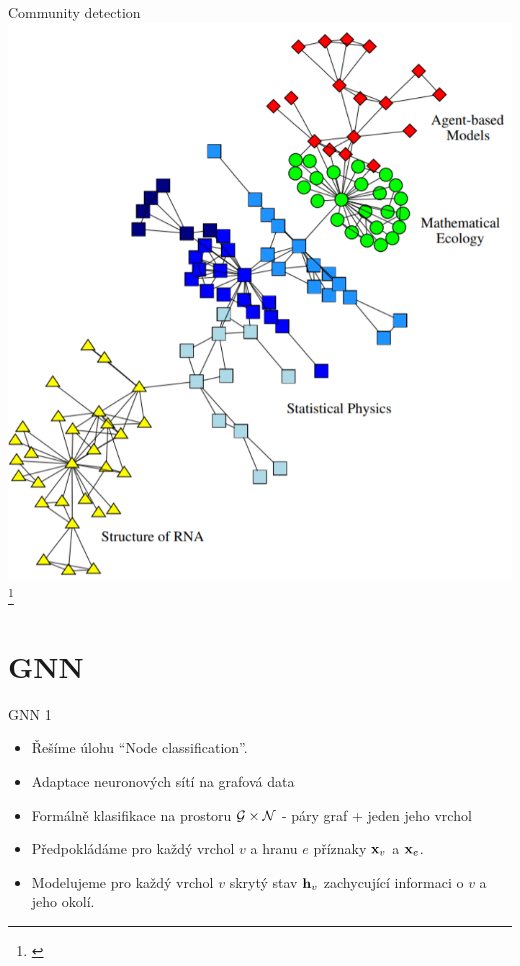 \documentclass[10pt]{beamer}
\newcommand{\mathvec}{\ensuremath{\mathbf}}
\newcommand{\mathspace}{\ensuremath{\mathcal}}
\begin{document}
\begin{frame}{Community detection}
	\centering
	\includegraphics[width=0.5\pagewidth]{images/community-detection.png}\footnote{\cite{girvan_community_2002}}
\end{frame}

\section{GNN}

\begin{frame}{GNN 1}
	\begin{itemize}
		\item Řešíme úlohu \enquote{Node classification}.
		\item Adaptace neuronových sítí na grafová data
		\item Formálně klasifikace na prostoru \( \mathspace{G} \times \mathspace{N} \) - páry graf + jeden jeho vrchol
		\item Předpokládáme pro každý vrchol \( v \) a hranu \( e \) příznaky \( \mathvec{x}_v \) a \( \mathvec{x}_e \).
		\item Modelujeme pro každý vrchol \( v \) skrytý stav \( \mathvec{h}_v \) zachycující informaci o \( v \) a jeho okolí.
	\end{itemize}
\end{frame}
\end{document}
